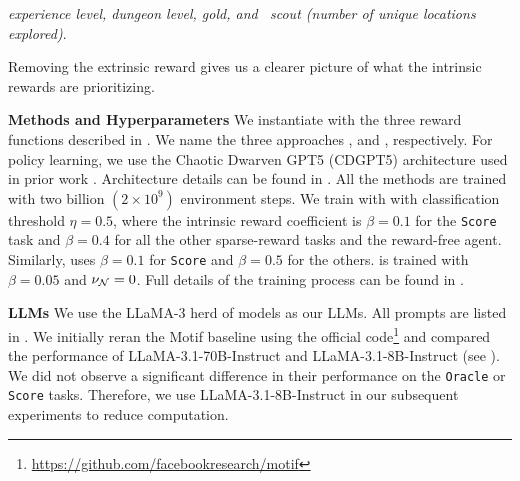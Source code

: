 {
\hspace*{15pt} \emph{experience level, \; dungeon level, \; gold, \; and \, scout (number of unique locations explored)}. 
}

Removing the extrinsic reward gives us a clearer picture of what the intrinsic rewards are prioritizing. 


%


%

\textbf{Methods and Hyperparameters} 
We instantiate \oni with the three reward functions described in . We name the three approaches \oniretrieval, \onicls and \oniranking, respectively.
For policy learning, we use the Chaotic Dwarven GPT5 (CDGPT5) architecture \citep{CDGPT5} used in prior work \citep{piterbarg2023nethack, kurenkov2023katakomba, klissarovdoro2023motif}. Architecture details can be found in .  
All the methods are trained with two billion $(2 \times 10^9)$ environment steps.  We train \onicls with 
with classification threshold $\eta=0.5$, where the intrinsic reward coefficient is $\beta = 0.1$ for the \texttt{Score} task and $\beta=0.4$ for all the other sparse-reward tasks and the reward-free agent. Similarly, \oniretrieval uses $\beta = 0.1$ for \texttt{Score} and $\beta=0.5$ for the others. 
\oniranking is trained with $\beta=0.05$ and $\nu_{\mathcal{N}} = 0$. Full details of the training process can be found in . 
 

\textbf{LLMs} We use the LLaMA-3 herd of models \citep{dubey2024llama3herdmodels} as our LLMs. All prompts are listed in . We initially reran the Motif baseline using the official code\footnote{\url{https://github.com/facebookresearch/motif}} and compared the performance of LLaMA-3.1-70B-Instruct and LLaMA-3.1-8B-Instruct (see ). We did not observe a significant difference in their performance on the \texttt{Oracle} or \texttt{Score} tasks.
%
Therefore, we use LLaMA-3.1-8B-Instruct in our subsequent experiments to reduce computation. 

